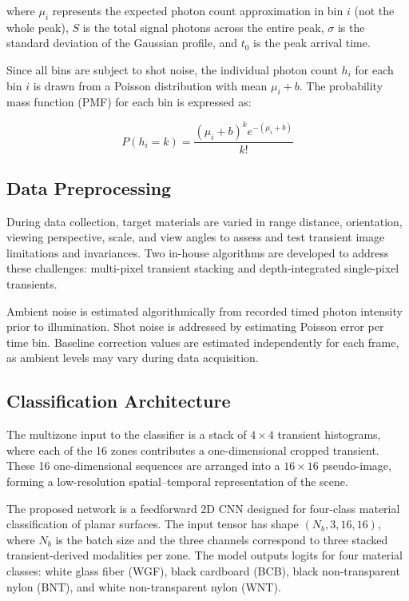 \documentclass[10pt,twocolumn]{article}
\begin{document}
where $\mu_i$ represents the expected photon count approximation in bin $i$ (not the whole peak), $S$ is the total signal photons across the entire peak, $\sigma$ is the standard deviation of the Gaussian profile, and $t_0$ is the peak arrival time.

Since all bins are subject to shot noise, the individual photon count $h_i$ for each bin $i$ is drawn from a Poisson distribution with mean $\mu_i + b$. The probability mass function (PMF) for each bin is expressed as:

\begin{equation}
P(h_i = k) = \frac{(\mu_i + b)^k e^{-(\mu_i + b)}}{k!}
\label{eq:poisson_pmf}
\end{equation}

\subsection{Data Preprocessing}

During data collection, target materials are varied in range distance, orientation, viewing perspective, scale, and view angles to assess and test transient image limitations and invariances. Two in-house algorithms are developed to address these challenges: multi-pixel transient stacking and depth-integrated single-pixel transients.

Ambient noise is estimated algorithmically from recorded timed photon intensity prior to illumination. Shot noise is addressed by estimating Poisson error per time bin. Baseline correction values are estimated independently for each frame, as ambient levels may vary during data acquisition.

\subsection{Classification Architecture}

The multizone input to the classifier is a stack of $4 \times 4$ transient histograms, where each of the 16 zones contributes a one-dimensional cropped transient. These 16 one-dimensional sequences are arranged into a $16 \times 16$ pseudo-image, forming a low-resolution spatial--temporal representation of the scene.

The proposed network is a feedforward 2D CNN designed for four-class material classification of planar surfaces. The input tensor has shape $(N_b,3,16,16)$, where $N_b$ is the batch size and the three channels correspond to three stacked transient-derived modalities per zone. The model outputs logits for four material classes: white glass fiber (WGF), black cardboard (BCB), black non-transparent nylon (BNT), and white non-transparent nylon (WNT).
\end{document}
